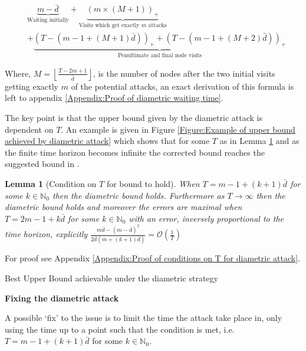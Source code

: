 \documentclass[a4paper,10pt]{article}
\newcommand{\floor}[1]{\left \lfloor #1 \right \rfloor}
\newcommand{\pospart}[1]{\left( #1 \right)_{+}}
\newtheorem{lemma}[theorem]{Lemma}
\theoremstyle{definition}
\theoremstyle{definition}
\theoremstyle{remark}
\theoremstyle{definition}
\begin{document}
\begin{align*}
&\underbrace{m-\bar{d}}_{\text{Waiting initially}} + \underbrace{\pospart{m \times \left( M +1 \right)}}_{\text{Visits which get exactly } m \text{ attacks}} \\
&+ \underbrace{\pospart{T- \left( m-1 + \left(M +1 \right) \bar{d} \right)}+\pospart{T- \left( m-1 + \left(M +2 \right) \bar{d} \right)}}_{\text{Penultimate and final node visits}} 
\end{align*}

Where, $M=\floor{\frac{T-2m+1}{\bar{d}}}$, is the number of nodes after the two initial visits getting exactly $m$ of the potential attacks, an exact derivation of this formula is left to appendix \ref{Appendix:Proof of diametric waiting time}.

The key point is that the upper bound given by the diametric attack is dependent on $T$. An example is given in Figure \ref{Figure:Example of upper bound achieved by diametric attack} which shows that for some $T$ as in Lemma \ref{Lemma:Condition on time horizon for diametric bound to hold} and as the finite time horizon becomes infinite the corrected bound reaches the suggested bound in \cite{Alpern2011}.

\begin{lemma}[Condition on $T$ for bound to hold]
\label{Lemma:Condition on time horizon for diametric bound to hold}
When $T=m-1+(k+1)\bar{d}$ for some $k \in \mathbb{N}_{0}$ then the diametric bound holds. Furthermore as $T \rightarrow \infty$ then the diametric bound holds and moreover the errors are maximal when $T=2m-1+k\bar{d}$ for some $k \in \mathbb{N}_{0}$ with an error, inversely proportional to the time horizon, explicitly $\frac{m\bar{d}-(m-\bar{d})^{2}}{2\bar{d}(m+(k+1)\bar{d})}=\mathcal{O}(\frac{1}{T})$
\end{lemma}

For proof see Appendix \ref{Appendix:Proof of conditions on T for diametric attack}.

\begin{myfigure}
\begin{center}

\end{center}
\caption{Best Upper Bound achievable under the diametric strategy}
\label{Figure:Example of upper bound achieved by diametric attack}
\end{myfigure}

\textbf{Fixing the diametric attack}

A possible `fix' to the issue is to limit the time the attack take place in, only using the time up to a point such that the condition is met, i.e. $T=m-1+(k+1)\bar{d}$ for some $k \in \mathbb{N}_{0}$.
\end{document}
